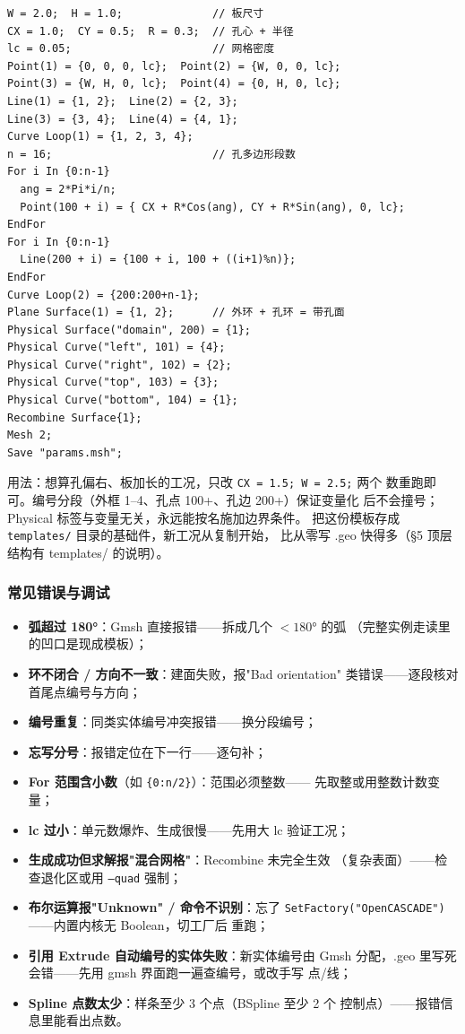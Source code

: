 \documentclass[12pt,a4paper]{ctexart}
\newcommand{\fem}{\Verb}
\begin{document}
\begin{lstlisting}
W = 2.0;  H = 1.0;              // 板尺寸
CX = 1.0;  CY = 0.5;  R = 0.3;  // 孔心 + 半径
lc = 0.05;                      // 网格密度
Point(1) = {0, 0, 0, lc};  Point(2) = {W, 0, 0, lc};
Point(3) = {W, H, 0, lc};  Point(4) = {0, H, 0, lc};
Line(1) = {1, 2};  Line(2) = {2, 3};
Line(3) = {3, 4};  Line(4) = {4, 1};
Curve Loop(1) = {1, 2, 3, 4};
n = 16;                         // 孔多边形段数
For i In {0:n-1}
  ang = 2*Pi*i/n;
  Point(100 + i) = { CX + R*Cos(ang), CY + R*Sin(ang), 0, lc};
EndFor
For i In {0:n-1}
  Line(200 + i) = {100 + i, 100 + ((i+1)%n)};
EndFor
Curve Loop(2) = {200:200+n-1};
Plane Surface(1) = {1, 2};      // 外环 + 孔环 = 带孔面
Physical Surface("domain", 200) = {1};
Physical Curve("left", 101) = {4};
Physical Curve("right", 102) = {2};
Physical Curve("top", 103) = {3};
Physical Curve("bottom", 104) = {1};
Recombine Surface{1};
Mesh 2;
Save "params.msh";
\end{lstlisting}

用法：想算孔偏右、板加长的工况，只改 \fem|CX = 1.5; W = 2.5;| 两个
数重跑即可。编号分段（外框 1--4、孔点 100+、孔边 200+）保证变量化
后不会撞号；Physical 标签与变量无关，永远能按名施加边界条件。
把这份模板存成 \fem|templates/| 目录的基础件，新工况从复制开始，
比从零写 .geo 快得多（§5 顶层结构有 templates/ 的说明）。

\subsubsection{常见错误与调试}

\begin{itemize}[leftmargin=*]
  \item \textbf{弧超过 180°}：Gmsh 直接报错——拆成几个 $<180°$ 的弧
        （完整实例走读里的凹口是现成模板）；
  \item \textbf{环不闭合 / 方向不一致}：建面失败，报"Bad orientation"
        类错误——逐段核对首尾点编号与方向；
  \item \textbf{编号重复}：同类实体编号冲突报错——换分段编号；
  \item \textbf{忘写分号}：报错定位在下一行——逐句补；
  \item \textbf{For 范围含小数}（如 \fem|{0:n/2}|）：范围必须整数——
        先取整或用整数计数变量；
  \item \textbf{lc 过小}：单元数爆炸、生成很慢——先用大 lc 验证工况；
  \item \textbf{生成成功但求解报"混合网格"}：Recombine 未完全生效
        （复杂表面）——检查退化区或用 \texttt{--quad} 强制；
  \item \textbf{布尔运算报"Unknown" / 命令不识别}：忘了
        \fem|SetFactory("OpenCASCADE")|——内置内核无 Boolean，切工厂后
        重跑；
  \item \textbf{引用 Extrude 自动编号的实体失败}：新实体编号由 Gmsh
        分配，.geo 里写死会错——先用 gmsh 界面跑一遍查编号，或改手写
        点/线；
  \item \textbf{Spline 点数太少}：样条至少 3 个点（BSpline 至少 2 个
        控制点）——报错信息里能看出点数。
\end{itemize}
\end{document}
